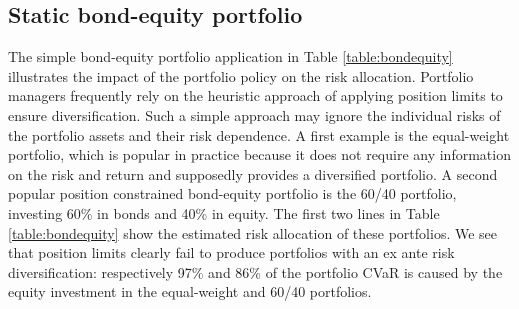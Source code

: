 \documentclass[12pt,a4paper]{article}
\begin{document}
\subsection{Static bond-equity portfolio}\label{subsec:bondequity}

The simple bond-equity portfolio application in Table \ref{table:bondequity} illustrates the impact of the portfolio policy on the risk allocation. Portfolio managers frequently rely on the heuristic approach of applying position limits to ensure diversification. Such a simple approach may ignore the individual risks of the portfolio assets and their risk dependence. A first example is the equal-weight portfolio, which is popular in practice because it does not require any information on the risk and return and supposedly provides a diversified portfolio. A second popular position constrained bond-equity portfolio is the 60/40 portfolio, investing 60\% in bonds and 40\% in equity. The first two lines in Table \ref{table:bondequity} show the estimated risk allocation of these portfolios.  We see that position limits clearly fail to produce portfolios with an ex ante risk diversification:  respectively 97\% and 86\% of the portfolio CVaR is caused by the equity investment in the equal-weight and 60/40 portfolios.

\begin{table}[h]
\caption{Weight and CVaR allocation of bond-equity portfolios, together with the in-sample annualized mean and monthly 95\% CVaR over
the period January 1976-June 2010.   \label{table:bondequity}  }
\vspace{1cm}
\end{table}
\end{document}
